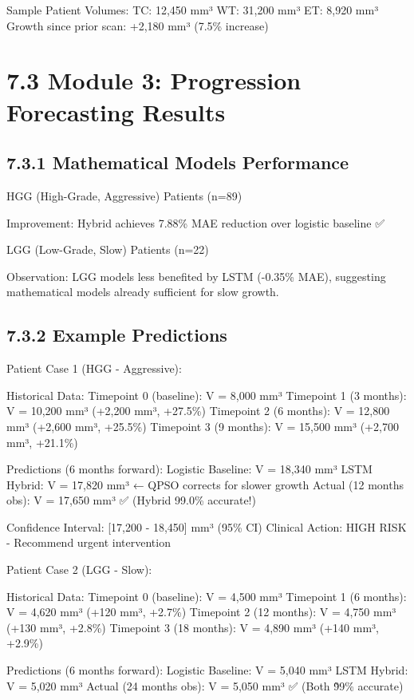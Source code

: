 Sample Patient Volumes:
  TC: 12,450 mm³
  WT: 31,200 mm³  
  ET: 8,920 mm³
  Growth since prior scan: +2,180 mm³ (7.5\% increase)


\section{7.3 Module 3: Progression Forecasting Results}

\subsection{7.3.1 Mathematical Models Performance}
HGG (High-Grade, Aggressive) Patients (n=89)

Improvement: Hybrid achieves 7.88\% MAE reduction over logistic baseline ✅

LGG (Low-Grade, Slow) Patients (n=22)

Observation: LGG models less benefited by LSTM (-0.35\% MAE), suggesting mathematical models already sufficient for slow growth.


\subsection{7.3.2 Example Predictions}
Patient Case 1 (HGG - Aggressive):

Historical Data:
  Timepoint 0 (baseline): V = 8,000 mm³
  Timepoint 1 (3 months):  V = 10,200 mm³ (+2,200 mm³, +27.5\%)
  Timepoint 2 (6 months):  V = 12,800 mm³ (+2,600 mm³, +25.5\%)
  Timepoint 3 (9 months):  V = 15,500 mm³ (+2,700 mm³, +21.1\%)

Predictions (6 months forward):
  Logistic Baseline:       V = 18,340 mm³
  LSTM Hybrid:             V = 17,820 mm³ ← QPSO corrects for slower growth
  Actual (12 months obs):  V = 17,650 mm³ ✅ (Hybrid 99.0\% accurate!)

Confidence Interval: [17,200 - 18,450] mm³ (95\% CI)
Clinical Action: HIGH RISK - Recommend urgent intervention

Patient Case 2 (LGG - Slow):

Historical Data:
  Timepoint 0 (baseline):  V = 4,500 mm³
  Timepoint 1 (6 months):  V = 4,620 mm³ (+120 mm³, +2.7\%)
  Timepoint 2 (12 months): V = 4,750 mm³ (+130 mm³, +2.8\%)
  Timepoint 3 (18 months): V = 4,890 mm³ (+140 mm³, +2.9\%)

Predictions (6 months forward):
  Logistic Baseline:       V = 5,040 mm³
  LSTM Hybrid:             V = 5,020 mm³
  Actual (24 months obs):  V = 5,050 mm³ ✅ (Both \~99\% accurate)


